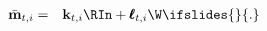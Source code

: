 \begin{eqnarray}
   \bar{\mathbf{m}}_{t,i} & = & \mathbf{k}_{t,i} \RIn + \mathbf{\pmb{\ell}}_{t,i} \W \label{eq:mFLess}
\ifslides{}{.}
\end{eqnarray}
